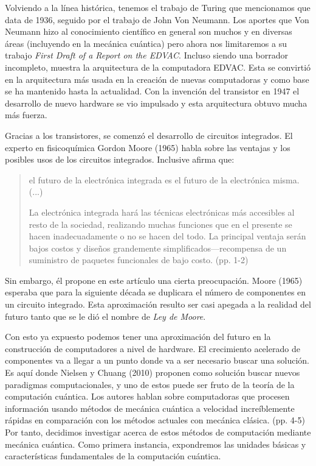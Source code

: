 \documentclass[11pt,a4paper]{article}
\begin{document}
Volviendo a la línea histórica, tenemos el trabajo de Turing que mencionamos que data de 1936, seguido por el trabajo de John Von Neumann. Los aportes que Von Neumann hizo al conocimiento científico en general son muchos y en diversas áreas (incluyendo en la mecánica cuántica) pero ahora nos limitaremos a su trabajo \textit{First Draft of a Report on the EDVAC}. Incluso siendo una borrador incompleto, muestra la arquitectura de la computadora EDVAC. Esta se convirtió en la arquitectura más usada en la creación de nuevas computadoras y como base se ha mantenido hasta la actualidad. Con la invención del transistor en 1947 el desarrollo de nuevo hardware se vio impulsado y esta arquitectura obtuvo mucha más fuerza.

Gracias a los transistores, se comenzó el desarrollo de circuitos integrados. El experto en fisicoquímica Gordon Moore (1965) habla sobre las ventajas y los posibles usos de los circuitos integrados. Inclusive afirma que: 
\begin{quote}
el futuro de la electrónica integrada es el futuro de la electrónica misma.(...)

La electrónica integrada hará las técnicas electrónicas más accesibles al resto de la sociedad, realizando muchas funciones que en el presente se hacen inadecuadamente o no se hacen del todo. La principal ventaja serán bajos costos y diseños grandemente simplificados---recompensa de un suministro de paquetes funcionales de bajo costo. (pp. 1-2)
\end{quote}
 Sin embargo, él propone en este artículo una cierta preocupación. Moore (1965) esperaba que para la siguiente década se duplicara el número de componentes en un circuito integrado. Esta aproximación resulto ser casi apegada a la realidad del futuro tanto que se le dió el nombre de \textit{Ley de Moore}.

Con esto ya expuesto podemos tener una aproximación del futuro en la construcción de computadores a nivel de hardware. El crecimiento acelerado de componentes va a llegar a un punto donde va a ser necesario buscar una solución. Es aquí donde Nielsen y Chuang (2010) proponen como solución buscar nuevos paradigmas computacionales, y uno de estos puede ser fruto de la teoría de la computación cuántica. Los autores hablan sobre computadoras que procesen información usando métodos de mecánica cuántica a velocidad increíblemente rápidas en comparación con los métodos actuales con mecánica clásica. (pp. 4-5) Por tanto, decidimos investigar acerca de estos métodos de computación mediante mecánica cuántica. Como primera instancia, expondremos las unidades básicas y características fundamentales de la computación cuántica.
\clearpage
\end{document}
